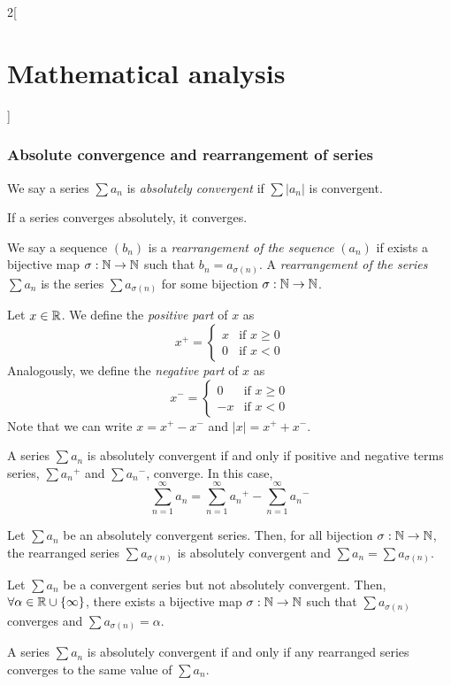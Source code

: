 \documentclass[../../../main.tex]{subfiles}
\begin{document}
\begin{multicols}{2}[\section{Mathematical analysis}]
  \subsubsection{Absolute convergence and rearrangement of series}
  \begin{definition}
    We say a series $\sum a_n$ is \emph{absolutely convergent} if $\sum |a_n|$ is convergent.
  \end{definition}
  \begin{theorem}
    If a series converges absolutely, it converges.
  \end{theorem}
  \begin{definition}
    We say a sequence $(b_n)$ is a \emph{rearrangement of the sequence} $(a_n)$ if exists a bijective map $\sigma:\mathbb{N} \rightarrow\mathbb{N} $ such that $b_n=a_{\sigma(n)}$. A \emph{rearrangement of the series} $\sum a_n$ is the series $\sum a_{\sigma(n)}$ for some bijection $\sigma:\mathbb{N} \rightarrow\mathbb{N} $.
  \end{definition}
  \begin{definition}
    Let $x\in\mathbb{R}$. We define the \emph{positive part} of $x$ as $$x^+=
      \begin{cases}
        x & \text{if }x\geq 0 \\
        0 & \text{if }x<0
      \end{cases}$$ Analogously, we define the \emph{negative part} of $x$ as $$x^-=
      \begin{cases}
        0  & \text{if }x\geq 0 \\
        -x & \text{if }x<0
      \end{cases}$$ Note that we can write $x=x^+-x^-$ and $|x|=x^++x^-$.
  \end{definition}
  \begin{theorem}
    A series $\sum a_n$ is absolutely convergent if and only if positive and negative terms series, $\sum {a_n}^+$ and $\sum {a_n}^-$, converge. In this case, $$\sum_{n=1}^\infty a_n=\sum_{n=1}^\infty {a_n}^+-\sum_{n=1}^\infty {a_n}^-$$
  \end{theorem}
  \begin{theorem}
    Let $\sum a_n$ be an absolutely convergent series. Then, for all bijection $\sigma:\mathbb{N} \rightarrow\mathbb{N} $, the rearranged series $\sum a_{\sigma(n)}$ is absolutely convergent and $\sum a_n=\sum a_{\sigma(n)}$.
  \end{theorem}
  \begin{theorem}
    Let $\sum a_n$ be a convergent series but not absolutely convergent. Then, $\forall\alpha\in\mathbb{R} \cup\{\infty\}$, there exists a bijective map $\sigma:\mathbb{N} \rightarrow\mathbb{N} $ such that $\sum a_{\sigma(n)}$ converges and $\sum a_{\sigma(n)}=\alpha$.
  \end{theorem}
  \begin{theorem}
    A series $\sum a_n$ is absolutely convergent if and only if any rearranged series converges to the same value of $\sum a_n$.
  \end{theorem}

\end{multicols}
\end{document}
